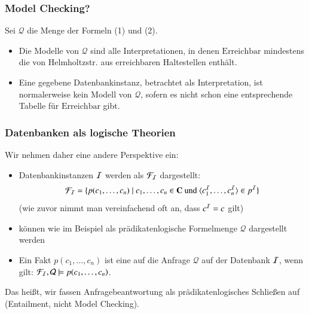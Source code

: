 \documentclass[aspectratio=1610,onlymath]{beamer}
\begin{document}
\begin{frame}\frametitle{Model Checking?}

\medskip

Sei $\mathcal{Q}$ die Menge der Formeln (1) und (2). \pause
\begin{itemize}
\item Die Modelle von $\mathcal{Q}$ sind alle Interpretationen, in denen $\text{Erreichbar}$ \alert{mindestens} die von Helmholtzstr. aus erreichbaren Haltestellen enthält.
\item Eine gegebene Datenbankinstanz, betrachtet als Interpretation, ist normalerweise kein Modell von $\mathcal{Q}$, sofern es nicht schon eine entsprechende Tabelle für $\text{Erreichbar}$ gibt.
\end{itemize}

\end{frame}

\begin{frame}\frametitle{Datenbanken als logische Theorien}

Wir nehmen daher eine andere Perspektive ein:
\begin{itemize}
\item Datenbankinstanzen $\mathcal{I}$ werden als  $\mathcal{F}_{\mathcal{I}}$ dargestellt:
\[ \mathcal{F}_{\mathcal{I}}= \{ p(c_1,\ldots,c_n)\mid c_1,\ldots,c_n\in\textbf{\textcolor{black}{C}}\text{ und }\langle{c_1^{\mathcal{I}},\ldots,c_n^{\mathcal{I}}}\rangle\in p^{\mathcal{I}}\}\]
\textcolor{devilscss}{(wie zuvor nimmt man vereinfachend oft an, dass $c^{\mathcal{I}}=c$ gilt)}
\item {} können wie im Beispiel als prädikatenlogische Formelmenge $\mathcal{Q}$ dargestellt werden
\item Ein Fakt $p(c_1,\ldots,c_n)$ ist eine  auf die Anfrage $\mathcal{Q}$ auf der Datenbank $\mathcal{I}$, wenn gilt: $\mathcal{F}_{\mathcal{I}},\mathcal{Q}\models p(c_1,\ldots,c_n)$.
\end{itemize}
Das heißt, wir fassen \alert{Anfragebeantwortung als prädikatenlogisches Schließen} auf (Entailment, nicht Model Checking).

\end{frame}
\end{document}
